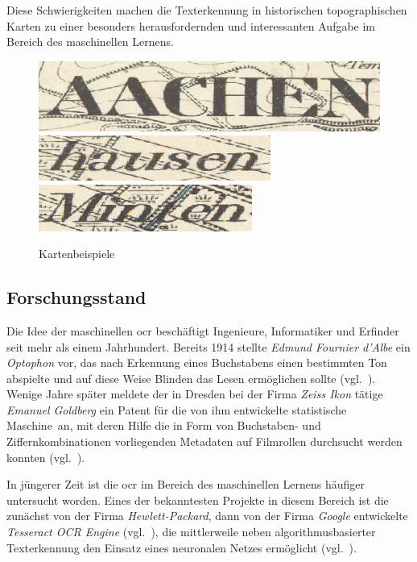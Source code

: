 Diese Schwierigkeiten machen die Texterkennung in historischen topographischen Karten zu einer besonders
herausfordernden und interessanten Aufgabe im Bereich des maschinellen Lernens.

\begin{figure}
    \centering
    \includegraphics{img/Aachen.jpg}
    \includegraphics{img/hausen.jpg}
    \includegraphics{img/Minten.jpg}
    \caption{Kartenbeispiele\label{einleitung:motivation:karten}}
\end{figure}

\subsection{Forschungsstand}
\label{einleitung:forschung}

Die Idee der maschinellen \gls{ocr} beschäftigt Ingenieure, Informatiker und Erfinder seit mehr als einem Jahrhundert.
Bereits 1914 stellte \textit{Edmund Fournier d'Albe} ein \textit{Optophon} vor, das nach Erkennung eines Buchstabens
einen bestimmten Ton abspielte und auf diese Weise Blinden das Lesen ermöglichen sollte (vgl.~\cite{albe1914}). Wenige
Jahre später meldete der in Dresden bei der Firma \textit{Zeiss Ikon} tätige \textit{Emanuel Goldberg} ein Patent für
die von ihm entwickelte \glqq statistische Maschine\grqq\ an, mit deren Hilfe die in Form von Buchstaben- und
Ziffernkombinationen vorliegenden Metadaten auf Filmrollen durchsucht werden konnten (vgl.~\cite{goldberg1931}).

In jüngerer Zeit ist die \gls{ocr} im Bereich des maschinellen Lernens häufiger untersucht worden. Eines der
bekanntesten Projekte in diesem Bereich ist die zunächst von der Firma \textit{Hewlett-Packard}, dann von der Firma
\textit{Google} entwickelte \textit{Tesseract OCR Engine} (vgl.~\cite{smith2007}), die mittlerweile neben
algorithmusbasierter Texterkennung den Einsatz eines neuronalen Netzes ermöglicht (vgl.~\cite{tesseract40}).

